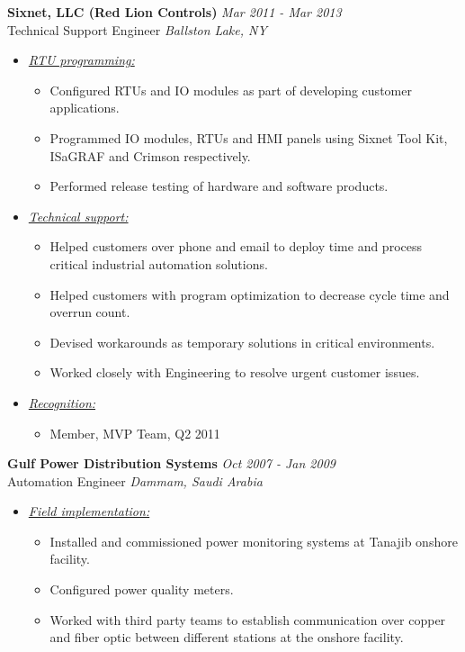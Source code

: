 \documentclass{article}
\begin{document}
    {\bf Sixnet, LLC (Red Lion Controls)} \hfill {\em Mar 2011 - Mar 2013} \\
    Technical Support Engineer \hfill {\em Ballston Lake, NY} \\
    \begin{itemize}
    \item \underline{\it RTU programming:}
          \begin{itemize}
          \item Configured RTUs and IO modules as part of developing customer
                applications.
          \item Programmed IO modules, RTUs and HMI panels using Sixnet Tool
                Kit, ISaGRAF and Crimson respectively.
          \item Performed release testing of hardware and software products.
          \end{itemize}
    \item \underline{\it Technical support:}
          \begin{itemize}
          \item Helped customers over phone and email to deploy time and process
                critical industrial automation solutions.
          \item Helped customers with program optimization to decrease cycle
                time and overrun count.
          \item Devised workarounds as temporary solutions in critical
                environments.
          \item Worked closely with Engineering to resolve urgent customer
                issues.
          \end{itemize}
    \item \underline{\it Recognition:}
          \begin{itemize}
          \item Member, MVP Team, Q2 2011
          \end{itemize}
    \end{itemize}
    \bigskip

    {\bf Gulf Power Distribution Systems} \hfill {\em Oct 2007 - Jan 2009} \\
    Automation Engineer \hfill {\em Dammam, Saudi Arabia} \\
    \begin{itemize}
    \item \underline{\it Field implementation:}
          \begin{itemize}
          \item Installed and commissioned power monitoring systems at Tanajib
                onshore facility.
          \item Configured power quality meters.
          \item Worked with third party teams to establish communication over
                copper and fiber optic between different stations at the onshore
                facility.
          \end{itemize}
    \end{itemize}
    \bigskip
\end{document}
